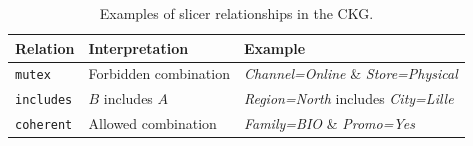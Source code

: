 \begin{table}[!t]
\centering
\caption{Examples of slicer relationships in the CKG.}
\scriptsize
\setlength{\tabcolsep}{3pt}
\begin{tabularx}{\columnwidth}{@{}p{1.25cm}p{2.15cm}X@{}}
\toprule
Relation & Interpretation & Example \\
\midrule
\texttt{mutex} & Forbidden combination & \textit{Channel=Online} \& \textit{Store=Physical} \\
\texttt{includes} & $B$ includes $A$ & \textit{Region=North} includes \textit{City=Lille} \\
\texttt{coherent} & Allowed combination & \textit{Family=BIO} \& \textit{Promo=Yes} \\
\bottomrule
\end{tabularx}
\label{tab:slicers}
\normalsize
\end{table}
